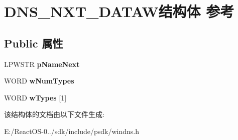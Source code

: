 \hypertarget{struct_d_n_s___n_x_t___d_a_t_a_w}{}\section{D\+N\+S\+\_\+\+N\+X\+T\+\_\+\+D\+A\+T\+A\+W结构体 参考}
\label{struct_d_n_s___n_x_t___d_a_t_a_w}
\subsection*{Public 属性}
\begin{DoxyCompactItemize}
\item 
\mbox{\label{struct_d_n_s___n_x_t___d_a_t_a_w_a52c5990c14e5f544ca5f39afae34d0be}} 
L\+P\+W\+S\+TR {\bfseries p\+Name\+Next}
\item 
\mbox{\label{struct_d_n_s___n_x_t___d_a_t_a_w_af1a57894eaa5e4f7efa54cf320537955}} 
W\+O\+RD {\bfseries w\+Num\+Types}
\item 
\mbox{\label{struct_d_n_s___n_x_t___d_a_t_a_w_ad0c81b987a4489193073749d357bc942}} 
W\+O\+RD {\bfseries w\+Types} \mbox{[}1\mbox{]}
\end{DoxyCompactItemize}


该结构体的文档由以下文件生成\+:\begin{DoxyCompactItemize}
\item 
E\+:/\+React\+O\+S-\/0../sdk/include/psdk/windns.\+h\end{DoxyCompactItemize}
